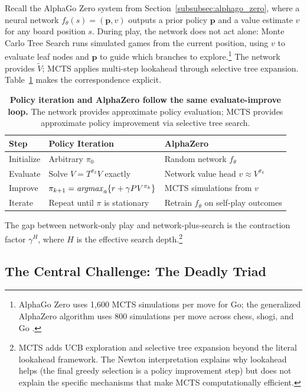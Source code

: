 Recall the AlphaGo Zero system from Section~\ref{subsubsec:alphago_zero}, where a neural network $f_\theta(s) = (\mathbf{p}, v)$ outputs a prior policy $\mathbf{p}$ and a value estimate $v$ for any board position $s$. During play, the network does not act alone: Monte Carlo Tree Search runs simulated games from the current position, using $v$ to evaluate leaf nodes and $\mathbf{p}$ to guide which branches to explore.\footnote{AlphaGo Zero uses 1,600 MCTS simulations per move for Go; the generalized AlphaZero algorithm uses 800 simulations per move across chess, shogi, and Go \citep[Table~S3]{Silver2018}.} The network provides $\tilde{V}$; MCTS applies multi-step lookahead through selective tree expansion. Table~\ref{tab:pi_alphazero} makes the correspondence explicit.

\begin{table}[h]
\centering
\small
\caption[Policy iteration and AlphaZero follow the same evaluate-improve loop]{\textbf{Policy iteration and AlphaZero follow the same evaluate-improve loop.} The network provides approximate policy evaluation; MCTS provides approximate policy improvement via selective tree search.}
\label{tab:pi_alphazero}
\begin{tabular}{lll}
\hline
Step & Policy Iteration & AlphaZero \\
\hline
Initialize & Arbitrary $\pi_0$ & Random network $f_\theta$ \\
Evaluate & Solve $V = T^{\pi_k} V$ exactly & Network value head $v \approx V^{\pi_k}$ \\
Improve & $\pi_{k+1} = \mathop{\it argmax}_a \{r + \gamma P V^{\pi_k}\}$ & MCTS simulations from $v$ \\
Iterate & Repeat until $\pi$ is stationary & Retrain $f_\theta$ on self-play outcomes \\
\hline
\end{tabular}
\end{table}

The gap between network-only play and network-plus-search is the contraction factor $\gamma^H$, where $H$ is the effective search depth.\footnote{MCTS adds UCB exploration and selective tree expansion beyond the literal lookahead framework. The Newton interpretation explains why lookahead helps (the final greedy selection is a policy improvement step) but does not explain the specific mechanisms that make MCTS computationally efficient.}

\subsection{The Central Challenge: The Deadly Triad}
\label{sec:deadly_triad}

